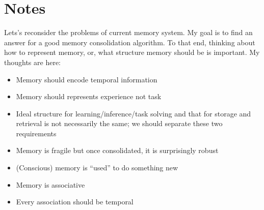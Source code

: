 \documentclass[12pt]{article}
\begin{document}
\section{Notes}
Lets's reconsider the problems of current memory system. My goal is to 
find an answer for a good memory consolidation algorithm. To that end, 
thinking about how to represent memory, or, what structure memory should 
be is important. My thoughts are here:
\begin{itemize}
    \item Memory should encode temporal information
    \item Memory should represents experience not task
    \item Ideal structure for learning/inference/task solving and that for 
          storage and retrieval is not necessarily the same; we should 
          separate these two requirements
    \item Memory is fragile but once consolidated, it is surprisingly robust
    \item (Conscious) memory is ``used'' to do something new
    \item Memory is associative
    \item Every association should be temporal
\end{itemize}
\end{document}
